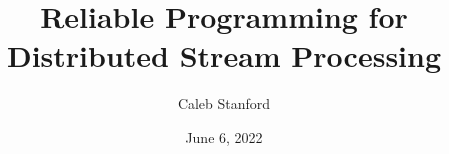 \documentclass{article}
\title{\Large{} Reliable Programming for Distributed Stream Processing}
\author{Caleb Stanford}
\date{June 6, 2022}
\begin{document}
\maketitle{}



\tableofcontents{}

% 














\renewcommand{\refname}{Other References}


\end{document}
